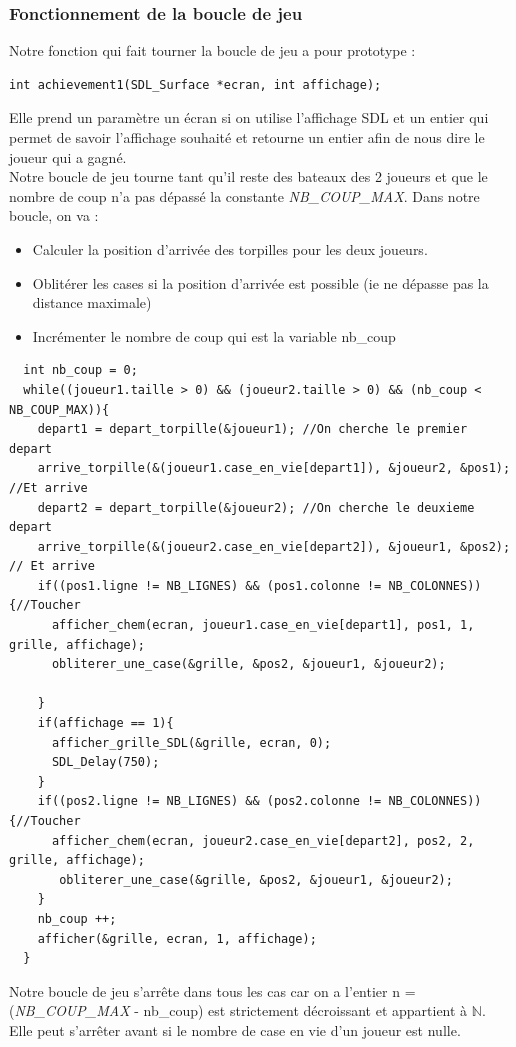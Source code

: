 \subsubsection{Fonctionnement de la boucle de jeu}
Notre fonction qui fait tourner la boucle de jeu a pour prototype :
\begin{lstlisting}
int achievement1(SDL_Surface *ecran, int affichage);
\end{lstlisting}
Elle prend un paramètre un écran si on utilise l'affichage SDL et un entier qui permet de savoir l'affichage souhaité et retourne un entier afin de nous dire le joueur qui a gagné.\\
Notre boucle de jeu tourne tant qu'il reste des bateaux des 2 joueurs et que le nombre de coup n'a pas dépassé la constante {\textit{NB\_COUP\_MAX}}. Dans notre boucle, on va :
\begin{itemize}
\item Calculer la position d'arrivée des torpilles pour les deux joueurs.
\item Oblitérer les cases si la position d'arrivée est possible (ie ne dépasse pas la distance maximale)
\item Incrémenter le nombre de coup qui est la variable nb\_coup 
\end{itemize}
\begin{lstlisting}
  int nb_coup = 0;
  while((joueur1.taille > 0) && (joueur2.taille > 0) && (nb_coup < NB_COUP_MAX)){
    depart1 = depart_torpille(&joueur1); //On cherche le premier depart
    arrive_torpille(&(joueur1.case_en_vie[depart1]), &joueur2, &pos1); //Et arrive
    depart2 = depart_torpille(&joueur2); //On cherche le deuxieme depart
    arrive_torpille(&(joueur2.case_en_vie[depart2]), &joueur1, &pos2); // Et arrive
    if((pos1.ligne != NB_LIGNES) && (pos1.colonne != NB_COLONNES)){//Toucher
      afficher_chem(ecran, joueur1.case_en_vie[depart1], pos1, 1, grille, affichage);
      obliterer_une_case(&grille, &pos2, &joueur1, &joueur2);
      
    }
    if(affichage == 1){
      afficher_grille_SDL(&grille, ecran, 0);
      SDL_Delay(750);
    }
    if((pos2.ligne != NB_LIGNES) && (pos2.colonne != NB_COLONNES)){//Toucher
      afficher_chem(ecran, joueur2.case_en_vie[depart2], pos2, 2, grille, affichage);
       obliterer_une_case(&grille, &pos2, &joueur1, &joueur2);
    }
    nb_coup ++;
    afficher(&grille, ecran, 1, affichage);
  }
\end{lstlisting}
Notre boucle de jeu s'arrête dans tous les cas car on a l'entier n = ({\textit{NB\_COUP\_MAX}} - nb\_coup) est strictement décroissant et appartient à $\mathbb{N}$. Elle peut s'arrêter avant si le nombre de case en vie d'un joueur est nulle. 
